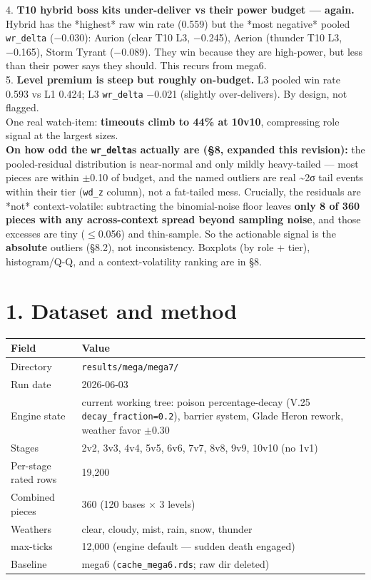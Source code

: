 \documentclass[10pt]{article}
\begin{document}
4. \textbf{T10 hybrid boss kits under-deliver vs their power budget --- again.} Hybrid has the *highest* raw win rate (0.559) but the *most negative* pooled \texttt{wr\_\allowbreak{}delta} (−0.030): Aurion (clear T10 L3, −0.245), Aerion (thunder T10 L3, −0.165), Storm Tyrant (−0.089). They win because they are high-power, but less than their power says they should. This recurs from mega6.\\

5. \textbf{Level premium is steep but roughly on-budget.} L3 pooled win rate 0.593 vs L1 0.424; L3 \texttt{wr\_\allowbreak{}delta} −0.021 (slightly over-delivers). By design, not flagged.\\

One real watch-item: \textbf{timeouts climb to 44\% at 10v10}, compressing role signal at the largest sizes.\\

\textbf{On how odd the \texttt{wr\_\allowbreak{}delta}s actually are (\S{}8, expanded this revision):} the pooled-residual distribution is near-normal and only mildly heavy-tailed --- most pieces are within $\pm$0.10 of budget, and the named outliers are real \textasciitilde{}2σ tail events within their tier (\texttt{wd\_\allowbreak{}z} column), not a fat-tailed mess. Crucially, the residuals are *not* context-volatile: subtracting the binomial-noise floor leaves \textbf{only 8 of 360 pieces with any across-context spread beyond sampling noise}, and those excesses are tiny ($\leq$0.056) and thin-sample. So the actionable signal is the \textbf{absolute} outliers (\S{}8.2), not inconsistency. Boxplots (by role + tier), histogram/Q-Q, and a context-volatility ranking are in \S{}8.\\

\section*{1. Dataset and method}

\medskip
\begin{tabularx}{\linewidth}{LL}
\toprule
\textbf{Field} & \textbf{Value} \\
\midrule
Directory & \texttt{results/\allowbreak{}mega/\allowbreak{}mega7/\allowbreak{}} \\
Run date & 2026-06-03 \\
Engine state & current working tree: poison percentage-decay (V.25 \texttt{decay\_\allowbreak{}fraction=0.\allowbreak{}2}), barrier system, Glade Heron rework, weather favor $\pm$0.30 \\
Stages & 2v2, 3v3, 4v4, 5v5, 6v6, 7v7, 8v8, 9v9, 10v10 (no 1v1) \\
Per-stage rated rows & 19,200 \\
Combined pieces & 360 (120 bases $\times$ 3 levels) \\
Weathers & clear, cloudy, mist, rain, snow, thunder \\
max-ticks & 12,000 (engine default --- sudden death engaged) \\
Baseline & mega6 (\texttt{cache\_\allowbreak{}mega6.\allowbreak{}rds}; raw dir deleted) \\
\bottomrule
\end{tabularx}
\medskip
\end{document}
